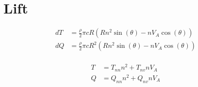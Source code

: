 \documentclass[12pt,a4]{article}
\begin{document}
\section{Lift}

\begin{align*}
    dT &= \frac{\rho}{2} \pi c R \left( Rn^2 \sin(\theta) - nV_A \cos(\theta) \right)  \\
    dQ &= \frac{\rho}{2} \pi c R^2 \left( Rn^2 \sin(\theta) - nV_A \cos(\theta) \right)   \\
\end{align*}

\begin{align*}
    T &= T_{nn} n^2 + T_{nv} nV_A   \\
    Q &= Q_{nn} n^2 + Q_{nv} nV_A
\end{align*}
\end{document}
